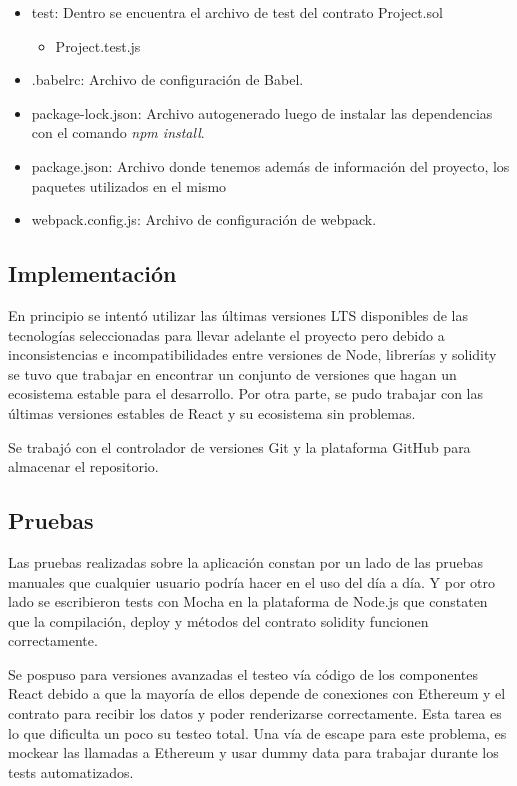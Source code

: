 \begin{itemize}
	\item test: Dentro se encuentra el archivo de test del contrato Project.sol
		\begin{itemize}
			\item Project.test.js
		\end{itemize}
	
	\item .babelrc: Archivo de configuración de Babel.
	\item package-lock.json: Archivo autogenerado luego de instalar las dependencias con el comando
	\textit{npm install}.
	\item package.json: Archivo donde tenemos además de información del proyecto, los paquetes utilizados en el mismo
	\item webpack.config.js: Archivo de configuración de webpack.
\end{itemize}

\subsection{Implementación}
En principio se intentó utilizar las últimas versiones LTS disponibles de las tecnologías
seleccionadas para llevar adelante el proyecto pero debido a inconsistencias e incompatibilidades
entre versiones de Node, librerías y solidity se tuvo que trabajar en encontrar un conjunto de
versiones que hagan un ecosistema estable para el desarrollo. Por otra parte, se pudo trabajar con
las últimas versiones estables de React y su ecosistema sin problemas.

Se trabajó con el controlador de versiones Git y la plataforma GitHub para almacenar el
repositorio.

\subsection{Pruebas}
Las pruebas realizadas sobre la aplicación constan por un lado de las pruebas manuales que
cualquier usuario podría hacer en el uso del día a día. Y por otro lado se escribieron tests con
Mocha en la plataforma de Node.js que constaten que la compilación, deploy y métodos del contrato
solidity funcionen correctamente.

Se pospuso para versiones avanzadas el testeo vía código de los componentes React debido a que la
mayoría de ellos depende de conexiones con Ethereum y el contrato para recibir los datos y poder
renderizarse correctamente. Esta tarea es lo que dificulta un poco su testeo total. Una vía de escape
para este problema, es mockear las llamadas a Ethereum y usar dummy data para trabajar durante los
tests automatizados.

